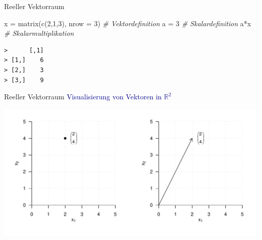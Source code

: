 \documentclass[
  8pt,
  ignorenonframetext,
]{beamer}
\newenvironment{Shaded}{\begin{snugshade}}{\end{snugshade}}
\newcommand{\AttributeTok}[1]{\textcolor[rgb]{0.77,0.63,0.00}{#1}}
\newcommand{\CommentTok}[1]{\textcolor[rgb]{0.56,0.35,0.01}{\textit{#1}}}
\newcommand{\DecValTok}[1]{\textcolor[rgb]{0.00,0.00,0.81}{#1}}
\newcommand{\FunctionTok}[1]{\textcolor[rgb]{0.00,0.00,0.00}{#1}}
\newcommand{\NormalTok}[1]{#1}
\newcommand{\OtherTok}[1]{\textcolor[rgb]{0.56,0.35,0.01}{#1}}
\newcommand{\SpecialCharTok}[1]{\textcolor[rgb]{0.00,0.00,0.00}{#1}}
\begin{document}
\begin{frame}[fragile]{Reeller Vektorraum}
\begin{Shaded}
\begin{Highlighting}[]
\NormalTok{x }\OtherTok{=} \FunctionTok{matrix}\NormalTok{(}\FunctionTok{c}\NormalTok{(}\DecValTok{2}\NormalTok{,}\DecValTok{1}\NormalTok{,}\DecValTok{3}\NormalTok{), }\AttributeTok{nrow =} \DecValTok{3}\NormalTok{)       }\CommentTok{\# Vektordefinition}
\NormalTok{a }\OtherTok{=} \DecValTok{3}                                \CommentTok{\# Skalardefinition}
\NormalTok{a}\SpecialCharTok{*}\NormalTok{x                                  }\CommentTok{\# Skalarmultiplikation}
\end{Highlighting}
\end{Shaded}

\begin{verbatim}
>      [,1]
> [1,]    6
> [2,]    3
> [3,]    9
\end{verbatim}
\end{frame}

\begin{frame}{Reeller Vektorraum}
\protect\hypertarget{reeller-vektorraum-5}{}
\textcolor{darkblue}{Visualisierung von Vektoren in $\mathbb{R}^2$}

\begin{center}\includegraphics[width=1\linewidth]{2_Abbildungen/mvda_2_vektoren_R2} \end{center}
\end{frame}
\end{document}
